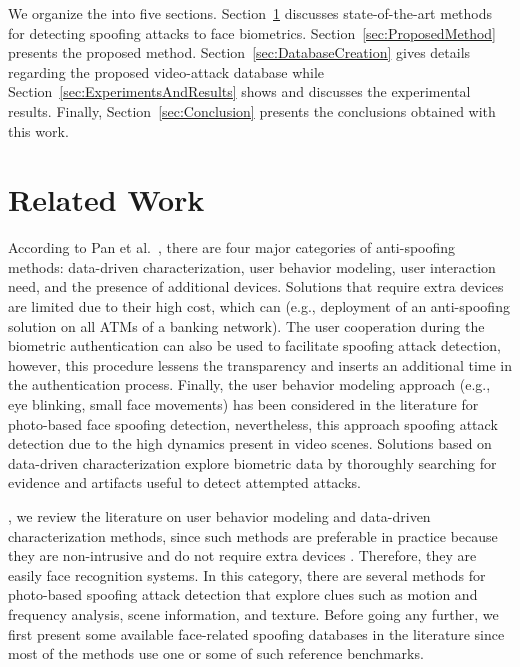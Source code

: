 \documentclass[journal]{IEEEtran}
\providecommand{\rv}[1]{{\protect\color{black}{#1}}}
\providecommand{\bmark}[1]{{\protect\color{black}{#1}}}
\begin{document}
{We organize the \bmark{remainder of this paper} into five sections. Section~\ref{sec:RelatedWork} discusses state-of-the-art methods for detecting spoofing attacks to face biometrics. Section~\ref{sec:ProposedMethod} presents the proposed method. Section~\ref{sec:DatabaseCreation} gives details regarding the proposed video-attack database while Section~\ref{sec:ExperimentsAndResults} shows and discusses the experimental results. Finally, Section~\ref{sec:Conclusion} presents the conclusions obtained with this work.}

\section{Related Work}
\label{sec:RelatedWork}

According to Pan et al.~\cite{Pan_2008}, there are four major categories of anti-spoofing methods: data-driven characterization, user behavior modeling, user interaction need, and the presence of additional devices. Solutions that require extra devices are limited due to their high cost, which can \bmark{prevent large-scale use} (e.g., deployment of an anti-spoofing solution on all ATMs of a banking network). The user cooperation during the biometric authentication can also be used to facilitate spoofing attack detection, however, this procedure lessens the transparency and inserts an additional time in the authentication process. Finally, the user behavior modeling approach (e.g., eye blinking, small face movements) has been considered in the literature for photo-based face spoofing detection, nevertheless, this approach \bmark{might not work well for video-based} spoofing attack detection due to the high dynamics present in video scenes. Solutions based on data-driven characterization explore biometric data by thoroughly searching for evidence and artifacts useful to detect attempted attacks.

\rv{In this section}, we review the literature on user behavior modeling and data-driven characterization methods, since such methods are preferable in practice because they are non-intrusive and do not require extra devices \bmark{or human interaction}. Therefore, they are easily \bmark{integrable with existing} face recognition systems. In this category, there are several methods for photo-based spoofing attack detection that explore clues such as motion and frequency analysis, scene information, and texture. Before going any further, \rv{however,} we first present some available face-related spoofing databases in the literature since most of the methods use one or some of such reference benchmarks.
\end{document}
